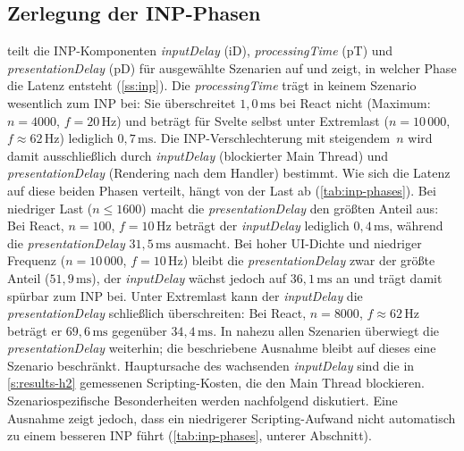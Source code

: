 \subsection{Zerlegung der INP-Phasen}
\label{ss:results-h1-phases}

 teilt die INP-Komponenten \textit{inputDelay} (iD), \textit{processingTime} (pT) und \textit{presentationDelay} (pD) für ausgewählte Szenarien auf und zeigt, in welcher Phase die Latenz entsteht (\cref{ss:inp}). Die \textit{processingTime} trägt in keinem Szenario wesentlich zum INP bei: Sie überschreitet $1{,}0\,\text{ms}$ bei React nicht (Maximum: $n = 4000$, $f = 20\,\text{Hz}$) und beträgt für Svelte selbst unter Extremlast ($n = 10\,000$, $f \approx 62\,\text{Hz}$) lediglich $0{,}7\,\text{ms}$. Die INP-Verschlechterung mit steigendem~$n$ wird damit ausschließlich durch \textit{inputDelay} (blockierter Main Thread) und \textit{presentationDelay} (Rendering nach dem Handler) bestimmt. Wie sich die Latenz auf diese beiden Phasen verteilt, hängt von der Last ab (\cref{tab:inp-phases}). Bei niedriger Last ($n \leq 1600$) macht die \textit{presentationDelay} den größten Anteil aus: Bei React, $n = 100$, $f = 10\,\text{Hz}$ beträgt der \textit{inputDelay} lediglich $0{,}4\,\text{ms}$, während die \textit{presentationDelay} $31{,}5\,\text{ms}$ ausmacht. Bei hoher UI-Dichte und niedriger Frequenz ($n = 10\,000$, $f = 10\,\text{Hz}$) bleibt die \textit{presentationDelay} zwar der größte Anteil ($51{,}9\,\text{ms}$), der \textit{inputDelay} wächst jedoch auf $36{,}1\,\text{ms}$ an und trägt damit spürbar zum INP bei. Unter Extremlast kann der \textit{inputDelay} die \textit{presentationDelay} schließlich überschreiten: Bei React, $n = 8000$, $f \approx 62\,\text{Hz}$ beträgt er $69{,}6\,\text{ms}$ gegenüber $34{,}4\,\text{ms}$. In nahezu allen Szenarien überwiegt die \textit{presentationDelay} weiterhin; die beschriebene Ausnahme bleibt auf dieses eine Szenario beschränkt. Hauptursache des wachsenden \textit{inputDelay} sind die in \cref{s:results-h2} gemessenen Scripting-Kosten, die den Main Thread blockieren. Szenariospezifische Besonderheiten werden nachfolgend diskutiert. Eine Ausnahme zeigt jedoch, dass ein niedrigerer Scripting-Aufwand nicht automatisch zu einem besseren INP führt (\cref{tab:inp-phases}, unterer Abschnitt). 

